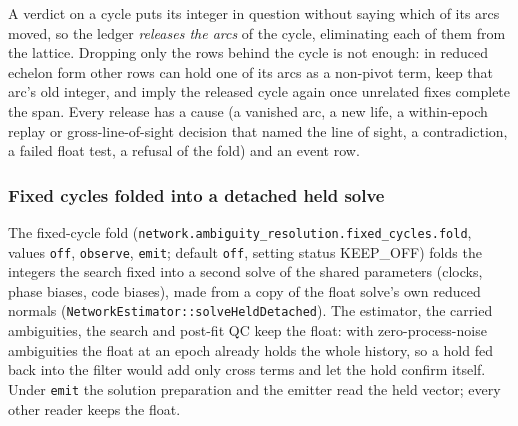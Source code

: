 \documentclass[main.tex]{subfiles}
\begin{document}
A verdict on a cycle puts its integer in question without saying which of its
arcs moved, so the ledger \emph{releases the arcs} of the cycle, eliminating each
of them from the lattice.  Dropping only the rows behind the cycle is not
enough: in reduced echelon form other rows can hold one of its arcs as a
non-pivot term, keep that arc's old integer, and imply the released cycle
again once unrelated fixes complete the span.  Every release has a cause
(a vanished arc, a new life, a within-epoch replay or gross-line-of-sight
decision that named the line of sight, a contradiction, a failed float test,
a refusal of the fold) and an event row.

\subsubsection{Fixed cycles folded into a detached held solve}\label{sec:ar-fixedcycles}

The fixed-cycle fold (\texttt{network.ambiguity\_resolution.fixed\_cycles.fold},
values \texttt{off}, \texttt{observe}, \texttt{emit}; default \texttt{off},
setting status KEEP\_OFF) folds the integers the search fixed into a second
solve of the shared parameters (clocks, phase biases, code biases), made from a
copy of the float solve's own reduced normals
(\texttt{NetworkEstimator::solveHeldDetached}).  The estimator, the carried
ambiguities, the search and post-fit QC keep the float: with
zero-process-noise ambiguities the float at an epoch already holds the whole
history, so a hold fed back into the filter would add only cross terms and let
the hold confirm itself.  Under \texttt{emit} the solution preparation and the
emitter read the held vector; every other reader keeps the float.
\end{document}
